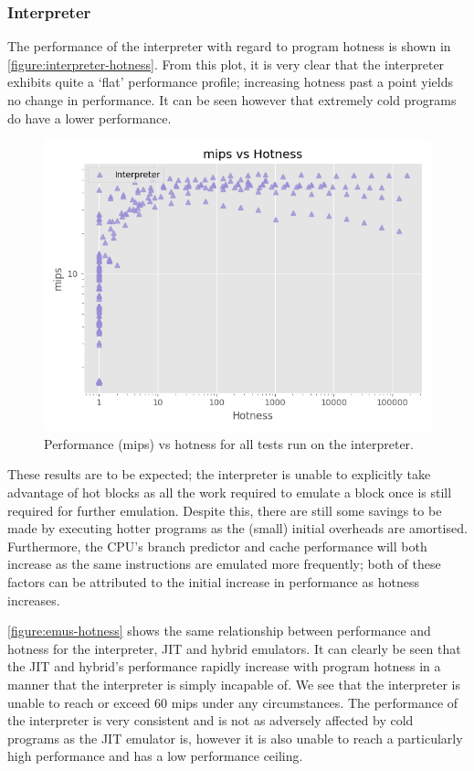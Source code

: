 \subsubsection{Interpreter}
\label{section:perf-interpreter}

The performance of the interpreter with regard to program hotness is shown in \autoref{figure:interpreter-hotness}. From this plot, it is very clear that the interpreter exhibits quite a `flat' performance profile; increasing hotness past a point yields no change in performance. It can be seen however that extremely cold programs do have a lower performance.

\begin{figure}[H]
    \centering
    \includegraphics[scale=0.75]{output/graphs/scatter/single/interpreter/hotness.png}
    \caption{Performance (mips) vs hotness for all tests run on the interpreter.}
    \label{figure:interpreter-hotness}
\end{figure}

These results are to be expected; the interpreter is unable to explicitly take advantage of hot blocks as all the work required to emulate a block once is still required for further emulation. Despite this, there are still some savings to be made by executing hotter programs as the (small) initial overheads are amortised. Furthermore, the CPU's branch predictor and cache performance will both increase as the same instructions are emulated more frequently; both of these factors can be attributed to the initial increase in performance as hotness increases.

\autoref{figure:emus-hotness} shows the same relationship between performance and hotness for the interpreter, JIT and hybrid emulators. It can clearly be seen that the JIT and hybrid's performance rapidly increase with program hotness in a manner that the interpreter is simply incapable of. We see that the interpreter is unable to reach or exceed 60 mips under any circumstances. The performance of the interpreter is very consistent and is not as adversely affected by cold programs as the JIT emulator is, however it is also unable to reach a particularly high performance and has a low performance ceiling.


